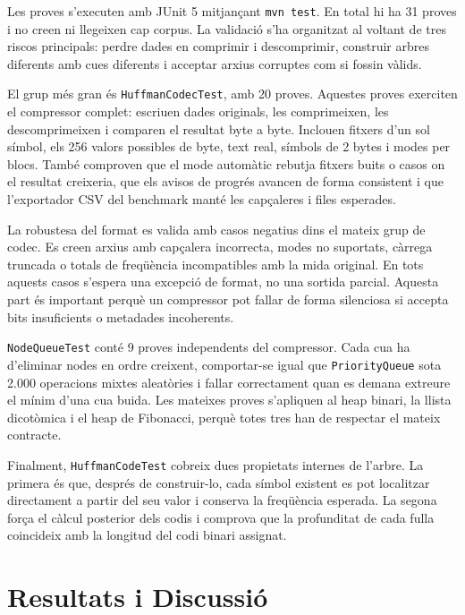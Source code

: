 \documentclass[conference,compsoc]{IEEEtran}
\begin{document}
Les proves s'executen amb JUnit 5 mitjançant \texttt{mvn test}. En total hi
ha 31 proves i no creen ni llegeixen cap corpus. La
validació s'ha organitzat al voltant de tres riscos principals: perdre
dades en comprimir i descomprimir, construir arbres diferents amb cues diferents i
acceptar arxius corruptes com si fossin vàlids.

El grup més gran és \texttt{HuffmanCodecTest}, amb 20 proves. Aquestes
proves exerciten el compressor complet: escriuen dades originals, les
comprimeixen, les descomprimeixen i comparen el resultat byte a byte.
Inclouen fitxers d'un sol símbol, els 256 valors possibles de byte, text
real, símbols de 2 bytes i modes per blocs. També comproven que el mode
automàtic rebutja fitxers buits o casos on el resultat creixeria, que els
avisos de progrés avancen de forma consistent i que l'exportador CSV del
benchmark manté les capçaleres i files esperades.

La robustesa del format es valida amb casos negatius dins el mateix grup de
codec. Es creen arxius amb capçalera incorrecta, modes no suportats,
càrrega truncada o totals de freqüència incompatibles amb la mida original.
En tots aquests casos s'espera una excepció de format, no una sortida
parcial. Aquesta part és important perquè un compressor pot fallar de forma
silenciosa si accepta bits insuficients o metadades incoherents.

\texttt{NodeQueueTest} conté 9 proves independents del compressor. Cada cua
ha d'eliminar nodes en ordre creixent, comportar-se igual que
\texttt{PriorityQueue} sota 2.000 operacions mixtes aleatòries i fallar
correctament quan es demana extreure el mínim d'una cua buida. Les mateixes
proves s'apliquen al heap binari, la llista dicotòmica i el heap de
Fibonacci, perquè totes tres han de respectar el mateix contracte.

Finalment, \texttt{HuffmanCodeTest} cobreix dues propietats internes de
l'arbre. La primera és que, després de construir-lo, cada símbol existent es
pot localitzar directament a partir del seu valor i conserva la freqüència
esperada. La segona força el càlcul posterior dels codis i comprova que la
profunditat de cada fulla coincideix amb la longitud del codi binari
assignat.

\section{Resultats i Discussió}
\label{sec:resultats}
\end{document}
